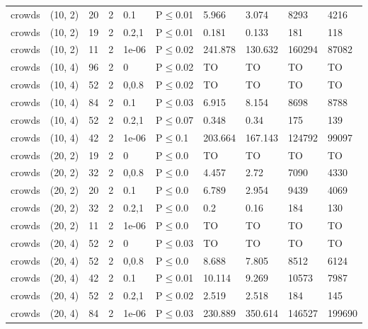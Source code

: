 \begin{longtable}{llrrllllll}
 crowds        & (10, 2)   &     	20 &   2 & 0.1   & P$\leq$0.01  & 5.966    & 3.074    & 8293    & 4216   \\
 crowds        & (10, 2)   &     	19 &   2 & 0.2,1 & P$\leq$0.01  & 0.181    & 0.133    & 181     & 118    \\
 crowds        & (10, 2)   &     	11 &   2 & 1e-06 & P$\leq$0.02  & 241.878  & 130.632  & 160294  & 87082  \\
 crowds        & (10, 4)   &     	96 &   2 & 0     & P$\leq$0.02  & TO       & TO       & TO      & TO     \\
 crowds        & (10, 4)   &     	52 &   2 & 0,0.8 & P$\leq$0.02  & TO       & TO       & TO      & TO     \\
 crowds        & (10, 4)   &     	84 &   2 & 0.1   & P$\leq$0.03  & 6.915    & 8.154    & 8698    & 8788   \\
 crowds        & (10, 4)   &     	52 &   2 & 0.2,1 & P$\leq$0.07  & 0.348    & 0.34     & 175     & 139    \\
 crowds        & (10, 4)   &     	42 &   2 & 1e-06 & P$\leq$0.1   & 203.664  & 167.143  & 124792  & 99097  \\
 crowds        & (20, 2)   &     	19 &   2 & 0     & P$\leq$0.0   & TO       & TO       & TO      & TO     \\
 crowds        & (20, 2)   &     	32 &   2 & 0,0.8 & P$\leq$0.0   & 4.457    & 2.72     & 7090    & 4330   \\
 crowds        & (20, 2)   &     	20 &   2 & 0.1   & P$\leq$0.0   & 6.789    & 2.954    & 9439    & 4069   \\
 crowds        & (20, 2)   &     	32 &   2 & 0.2,1 & P$\leq$0.0   & 0.2      & 0.16     & 184     & 130    \\
 crowds        & (20, 2)   &     	11 &   2 & 1e-06 & P$\leq$0.0   & TO       & TO       & TO      & TO     \\
 crowds        & (20, 4)   &     	52 &   2 & 0     & P$\leq$0.03  & TO       & TO       & TO      & TO     \\
 crowds        & (20, 4)   &     	52 &   2 & 0,0.8 & P$\leq$0.0   & 8.688    & 7.805    & 8512    & 6124   \\
 crowds        & (20, 4)   &     	42 &   2 & 0.1   & P$\leq$0.01  & 10.114   & 9.269    & 10573   & 7987   \\
 crowds        & (20, 4)   &     	52 &   2 & 0.2,1 & P$\leq$0.02  & 2.519    & 2.518    & 184     & 145    \\
 crowds        & (20, 4)   &     	84 &   2 & 1e-06 & P$\leq$0.03  & 230.889  & 350.614  & 146527  & 199690 \\

\end{longtable}
